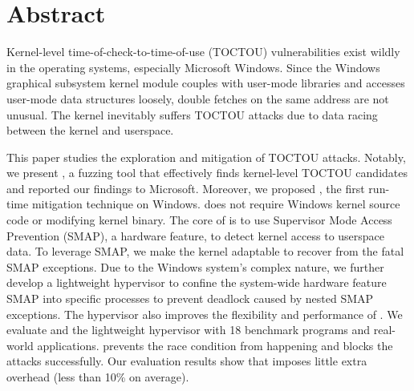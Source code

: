 \section{Abstract}

Kernel-level time-of-check-to-time-of-use (TOCTOU) vulnerabilities exist wildly in the operating systems, especially Microsoft Windows. Since the Windows graphical subsystem kernel module couples with user-mode libraries and accesses user-mode data structures loosely, double fetches on the same address are not unusual. The kernel inevitably suffers TOCTOU attacks due to data racing between the kernel and userspace.

This paper studies the exploration and mitigation of TOCTOU attacks. Notably, we present \toolname, a fuzzing tool that effectively finds kernel-level TOCTOU candidates and reported our findings to Microsoft. Moreover, we proposed \name, the first run-time mitigation technique on Windows. \name does not require Windows kernel source code or modifying kernel binary. The core of \name is to use Supervisor Mode Access Prevention (SMAP), a hardware feature, to detect kernel access to userspace data. To leverage SMAP, we make the kernel adaptable to recover from the fatal SMAP exceptions. Due to the Windows system's complex nature, we further develop a lightweight hypervisor to confine the system-wide hardware feature SMAP into specific processes to prevent deadlock caused by nested SMAP exceptions. The hypervisor also improves the flexibility and performance of \name. We evaluate \name and the lightweight hypervisor with 18 benchmark programs and real-world applications. \name prevents the race condition from happening and blocks the attacks successfully. Our evaluation results show that \name imposes little extra overhead (less than 10\% on average).


